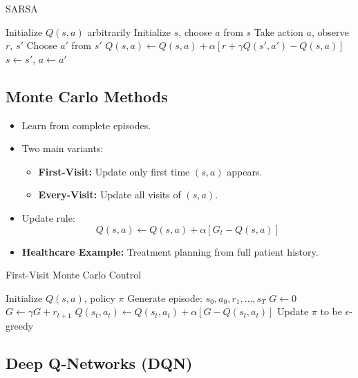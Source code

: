 \documentclass[12pt]{article}
\begin{document}
\begin{algorithm}[H]
\caption{SARSA}
\begin{algorithmic}[1]
\State Initialize $Q(s,a)$ arbitrarily
    \State Initialize $s$, choose $a$ from $s$
    \Repeat
        \State Take action $a$, observe $r$, $s'$
        \State Choose $a'$ from $s'$
        \State $Q(s,a) \leftarrow Q(s,a) + \alpha[r + \gamma Q(s',a') - Q(s,a)]$
        \State $s \leftarrow s'$, $a \leftarrow a'$
\EndFor
\end{algorithmic}
\end{algorithm}

\subsection{Monte Carlo Methods}
\begin{itemize}
    \item Learn from complete episodes.
    \item Two main variants:
    \begin{itemize}
        \item \textbf{First-Visit:} Update only first time $(s,a)$ appears.
        \item \textbf{Every-Visit:} Update all visits of $(s,a)$.
    \end{itemize}
    \item Update rule:
    \[
    Q(s,a) \leftarrow Q(s,a) + \alpha[G_t - Q(s,a)]
    \]
    \item \textbf{Healthcare Example:} Treatment planning from full patient history.
\end{itemize}

\begin{algorithm}[H]
\caption{First-Visit Monte Carlo Control}
\begin{algorithmic}[1]
\State Initialize $Q(s,a)$, policy $\pi$
    \State Generate episode: $s_0,a_0,r_1,\ldots,s_T$
    \State $G \leftarrow 0$
        \State $G \leftarrow \gamma G + r_{t+1}$
            \State $Q(s_t,a_t) \leftarrow Q(s_t,a_t) + \alpha[G - Q(s_t,a_t)]$
            \State Update $\pi$ to be $\epsilon$-greedy
        \EndIf
    \EndFor
\EndFor
\end{algorithmic}
\end{algorithm}

\subsection{Deep Q-Networks (DQN)}
\end{document}
